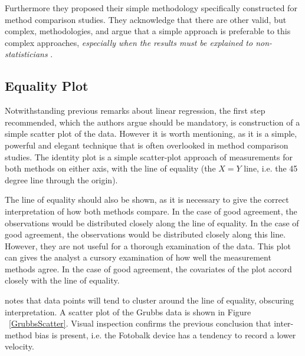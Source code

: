 \documentclass[12pt, a4paper]{report}
\theoremstyle{plain}
\theoremstyle{definition}
\theoremstyle{remark}
\begin{document}
Furthermore they proposed their simple methodology specifically constructed for method comparison studies. They acknowledge that there are other valid, but complex, methodologies, and argue that
		a simple approach is preferable to this complex approaches,
		\emph{especially when the results must be explained to
			non-statisticians} \citep*{BA83}.
		
		\subsection{Equality Plot}
Notwithstanding previous remarks about linear regression, the first step recommended, which the authors argue should be mandatory, is construction of a simple scatter plot of the data. However it is worth mentioning, as it is a simple, powerful and elegant technique that is often overlooked in method comparison studies. The identity plot is a simple scatter-plot approach of measurements for both methods on either axis, with the line of equality (the $X=Y$ line, i.e. the 45 degree line through the origin). 
			
The line of equality should also be shown, as it is necessary to give the correct interpretation of how both methods compare. In the case of good agreement, the observations would be distributed closely along the line of equality. In the case of good agreement, the observations would be distributed closely along this line. However, they are not useful for a thorough examination of the data.
This plot can gives the analyst a cursory examination of how well the measurement methods agree. In the case of good agreement, the covariates of the plot accord closely with the line of equality.

\citet{BritHypSoc} notes that data points will tend to cluster around the line of equality, obscuring interpretation. A scatter plot of the Grubbs data is shown in Figure ~\ref{GrubbsScatter}. Visual inspection confirms the previous conclusion that inter-method bias is present, i.e. the Fotobalk device has a tendency to record a lower velocity.
	
\end{document}

